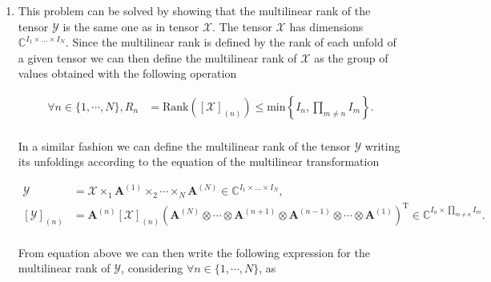 \documentclass[a4paper,10pt]{article}
\begin{document}

\thispagestyle{empty}

\newpage

\thispagestyle{empty}

\begin{enumerate}
\renewcommand{\labelenumi}{{\Large\bfseries\arabic{enumi}.}}
   
    \item This problem can be solved by showing that the multilinear rank of the tensor $\mathcal{Y}$ is the same one as in tensor $\mathcal{X}$. The tensor $\mathcal{X}$ has dimensions $\mathbb{C}^{I_{1} \times ... \times I_{N}}$. Since the multilinear rank is defined by the rank of each unfold of a given tensor we can then define the multilinear rank of $\mathcal{X}$ as the group of values obtained with the following operation
    
        \begin{align}
            \forall n \in \{1, \cdots, N\}, R_{n} &= \text{Rank}\left( \left[ \mathcal{X} \right]_{(n)} \right) \leq \text{min} \left\{ I_{n}, \prod_{m \neq n} I_{m} \right\}. \label{eq:01}
        \end{align}
        
        \paragraph{}In a similar fashion we can define the multilinear rank of the tensor $\mathcal{Y}$  writing its unfoldings according to the equation of the multilinear transformation
        
        \begin{align}
            \mathcal{Y} &= \mathcal{X} \times_{1} \boldsymbol{A}^{(1)} \times_{2} \cdots \times_{N} \boldsymbol{A}^{(N)} \in \mathbb{C}^{I_{1} \times ... \times I_{N}}, \\
            \left[ \mathcal{Y} \right]_{(n)} &= \boldsymbol{A}^{(n)} \left[ \mathcal{X} \right]_{(n)} \left( \boldsymbol{A}^{(N)} \otimes \cdots \otimes \boldsymbol{A}^{(n+1)} \otimes \boldsymbol{A}^{(n-1)} \otimes \cdots \otimes \boldsymbol{A}^{(1)} \right)^{\text{T}} \in \mathbb{C}^{I_{n} \times \prod_{m \neq n} I_{m}}.
        \end{align}
        
        \paragraph{}From equation above we can then write the following expression for the multilinear rank of $\mathcal{Y}$, considering $\forall n \in \{1, \cdots, N\}$, as
        

\end{enumerate}
\end{document}
